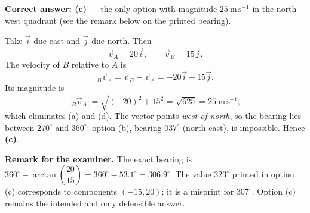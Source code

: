 \documentclass[11pt]{article}
\newcommand{\legende}[1]{\par\vspace{6pt}{\popsemi\fontsize{9}{11.5}\selectfont\color{popmuted}#1}}
\begin{document}
\begin{corrige}
\textbf{Correct answer: (c)} --- the only option with magnitude $25\ \mathrm{m\,s^{-1}}$ in the north-west quadrant (see the remark below on the printed bearing).

Take $\vec{i}$ due east and $\vec{j}$ due north. Then
\[
\vec{v}_A = 20\vec{i}, \qquad \vec{v}_B = 15\vec{j}.
\]
The velocity of $B$ relative to $A$ is
\[
{}_B\vec{v}_A = \vec{v}_B - \vec{v}_A = -20\vec{i} + 15\vec{j}.
\]
Its magnitude is
\[
|{}_B\vec{v}_A| = \sqrt{(-20)^2 + 15^2} = \sqrt{625} = 25\ \mathrm{m\,s^{-1}},
\]
which eliminates (a) and (d). The vector points \emph{west of north}, so the bearing lies between $270^{\circ}$ and $360^{\circ}$: option (b), bearing $037^{\circ}$ (north-east), is impossible. Hence \textbf{(c)}.

\begin{popfigure}
\begin{center}
\end{center}
\legende{Vector triangle: ${}_B\vec{v}_A = \vec{v}_B + (-\vec{v}_A)$.}
\end{popfigure}

\textbf{Remark for the examiner.} The exact bearing is $360^{\circ} - \arctan\!\left(\dfrac{20}{15}\right) = 360^{\circ} - 53.1^{\circ} = 306.9^{\circ}$. The value $323^{\circ}$ printed in option (c) corresponds to components $(-15, 20)$; it is a misprint for $307^{\circ}$. Option (c) remains the intended and only defensible answer.
\end{corrige}
\end{document}
